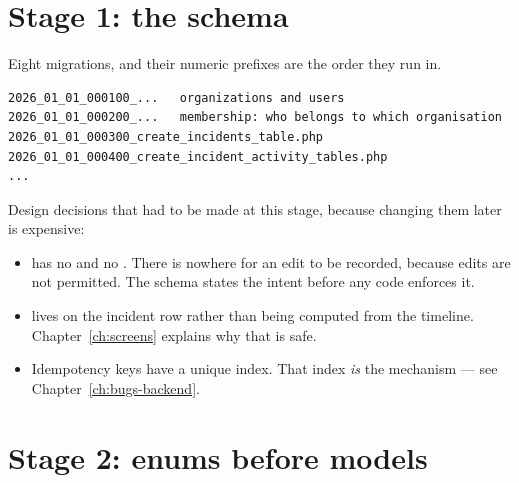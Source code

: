 
\section{Stage 1: the schema}

Eight migrations, and their numeric prefixes are the order they run in.

\begin{lstlisting}
2026_01_01_000100_...   organizations and users
2026_01_01_000200_...   membership: who belongs to which organisation
2026_01_01_000300_create_incidents_table.php
2026_01_01_000400_create_incident_activity_tables.php
...
\end{lstlisting}


Design decisions that had to be made at this stage, because changing them later
is expensive:

\begin{itemize}[leftmargin=1.4cm]
\item {} has no  and no
  . There is nowhere for an edit to be recorded, because
  edits are not permitted. The schema states the intent before any code enforces
  it.
\item {} lives on the incident row rather
  than being computed from the timeline. Chapter~\ref{ch:screens} explains why
  that is safe.
\item Idempotency keys have a unique index. That index \emph{is} the mechanism
  --- see Chapter~\ref{ch:bugs-backend}.
\end{itemize}

\section{Stage 2: enums before models}

